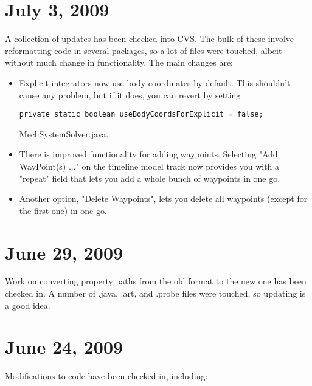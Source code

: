 \documentclass{article}
\begin{document}
\section*{July 3, 2009}

A collection of updates has been checked into CVS. The bulk of these 
involve reformatting code in several packages, so a lot of files were 
touched, albeit without much change in functionality. The main changes 
are:

\begin{itemize}

\item Explicit integrators now use body coordinates by default. This
shouldn't cause any problem, but if it does, you can revert by setting 
\begin{verbatim}
private static boolean useBodyCoordsForExplicit = false;
\end{verbatim}
{\sf MechSystemSolver.java}.

\item There is improved functionality for adding waypoints. Selecting 
{\sf "Add WayPoint(s) ..."} on the timeline model track now provides you 
with a {\sf "repeat"} field that lets you add a whole bunch of waypoints in 
one go.

\item Another option, {\sf "Delete Waypoints"}, lets you delete all waypoints 
(except for the first one) in one go. 

\end{itemize}

\section*{June 29, 2009}

Work on converting property paths from the old format to the new one
has been checked in. A number of .java, .art, and .probe files were 
touched, so updating is a good idea.

\section*{June 24, 2009}

Modifications to code have been checked in, including:
\end{document}
